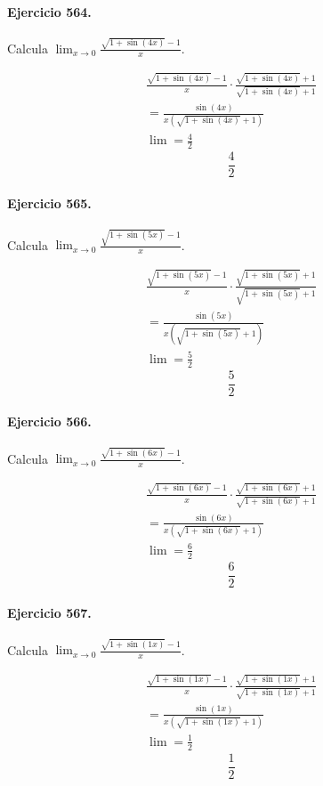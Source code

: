\documentclass[11pt,a4paper]{article}
\begin{document}
\paragraph{Ejercicio 564.} Calcula $\displaystyle\lim_{x\to0}\frac{\sqrt{1+\sin(4x)}-1}{x}$.

\[
\begin{aligned}
\frac{\sqrt{1+\sin(4x)}-1}{x}\cdot \frac{\sqrt{1+\sin(4x)}+1}{\sqrt{1+\sin(4x)}+1}\\
=\frac{\sin(4x)}{x(\sqrt{1+\sin(4x)}+1)}\\
\lim=\frac{4}{2}
\end{aligned}
\]
\[\boxed{\frac{4}{2}}\]


\paragraph{Ejercicio 565.} Calcula $\displaystyle\lim_{x\to0}\frac{\sqrt{1+\sin(5x)}-1}{x}$.

\[
\begin{aligned}
\frac{\sqrt{1+\sin(5x)}-1}{x}\cdot \frac{\sqrt{1+\sin(5x)}+1}{\sqrt{1+\sin(5x)}+1}\\
=\frac{\sin(5x)}{x(\sqrt{1+\sin(5x)}+1)}\\
\lim=\frac{5}{2}
\end{aligned}
\]
\[\boxed{\frac{5}{2}}\]


\paragraph{Ejercicio 566.} Calcula $\displaystyle\lim_{x\to0}\frac{\sqrt{1+\sin(6x)}-1}{x}$.

\[
\begin{aligned}
\frac{\sqrt{1+\sin(6x)}-1}{x}\cdot \frac{\sqrt{1+\sin(6x)}+1}{\sqrt{1+\sin(6x)}+1}\\
=\frac{\sin(6x)}{x(\sqrt{1+\sin(6x)}+1)}\\
\lim=\frac{6}{2}
\end{aligned}
\]
\[\boxed{\frac{6}{2}}\]


\paragraph{Ejercicio 567.} Calcula $\displaystyle\lim_{x\to0}\frac{\sqrt{1+\sin(1x)}-1}{x}$.

\[
\begin{aligned}
\frac{\sqrt{1+\sin(1x)}-1}{x}\cdot \frac{\sqrt{1+\sin(1x)}+1}{\sqrt{1+\sin(1x)}+1}\\
=\frac{\sin(1x)}{x(\sqrt{1+\sin(1x)}+1)}\\
\lim=\frac{1}{2}
\end{aligned}
\]
\[\boxed{\frac{1}{2}}\]
\end{document}

